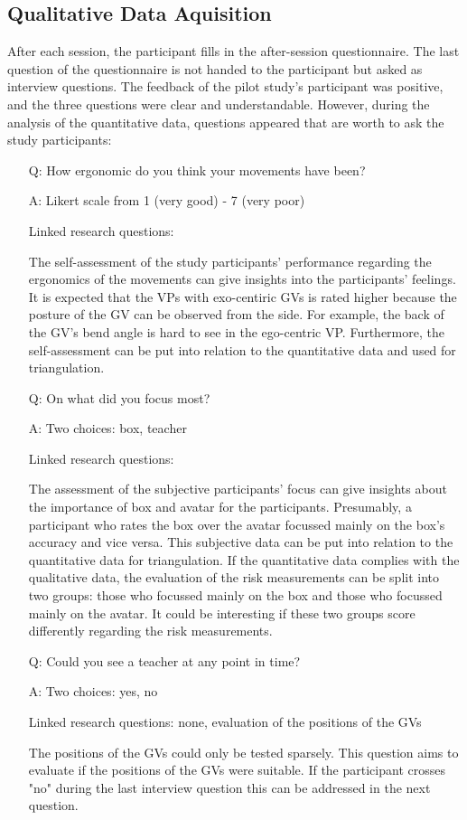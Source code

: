 \subsection{Qualitative Data Aquisition}
After each session, the participant fills in the after-session questionnaire. The last question of the questionnaire is not handed to the participant but asked as interview questions. The feedback of the pilot study's participant was positive, and the three questions were clear and understandable. However, during the analysis of the quantitative data, questions appeared that are worth to ask the study participants:
\begin{itemize}
	\item[Q:] How ergonomic do you think your movements have been?
	\item[A:] Likert scale from 1 (very good) - 7 (very poor)
	\item[] Linked research questions: 
	\item[] The self-assessment of the study participants' performance regarding the ergonomics of the movements can give insights into the participants' feelings. It is expected that the VPs with exo-centiric GVs is rated higher because the posture of the GV can be observed from the side. For example, the back of the GV's bend angle is hard to see in the ego-centric VP. Furthermore, the self-assessment can be put into relation to the quantitative data and used for triangulation.
	\item[Q:] On what did you focus most?
	\item[A:] Two choices: box, teacher
	\item[] Linked research questions: 
	\item[] The assessment of the subjective participants' focus can give insights about the importance of box and avatar for the participants. Presumably, a participant who rates the box over the avatar focussed mainly on the box's accuracy and vice versa. This subjective data can be put into relation to the quantitative data for triangulation. If the quantitative data complies with the qualitative data, the evaluation of the risk measurements can be split into two groups: those who focussed mainly on the box and those who focussed mainly on the avatar. It could be interesting if these two groups score differently regarding the risk measurements.
	\item[Q:] Could you see a teacher at any point in time?
	\item[A:] Two choices: yes, no
	\item[] Linked research questions: none, evaluation of the positions of the GVs
	\item[] The positions of the GVs could only be tested sparsely. This question aims to evaluate if the positions of the GVs were suitable. If the participant crosses "no" during the last interview question this can be addressed in the next question.
\end{itemize}
